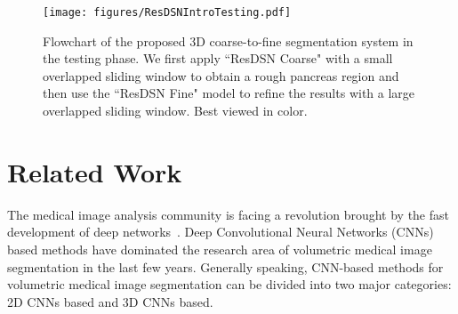 \documentclass[10pt,twocolumn,letterpaper]{article}
\begin{document}
\begin{figure*}[t]
  \centering
  \texttt{[image: figures/ResDSNIntroTesting.pdf]}\\
   \caption{Flowchart of the proposed 3D coarse-to-fine segmentation system in the testing phase. We first apply ``ResDSN Coarse" with a small overlapped sliding window to obtain a rough pancreas region and then use the ``ResDSN Fine" model to refine the results with a large overlapped sliding window.
   Best viewed in color.}
\label{fig:Intro}
\end{figure*}

\section{Related Work}
The medical image analysis community is facing a revolution brought by the fast development of deep networks~\cite{KrizhevskySH12}\cite{SimonyanZ14a}. Deep Convolutional Neural Networks (CNNs) based methods have dominated the research area of volumetric medical image segmentation in the last few years. Generally speaking, CNN-based methods for volumetric medical image segmentation can be divided into two major categories: 2D CNNs based and 3D CNNs based. 
\end{document}
